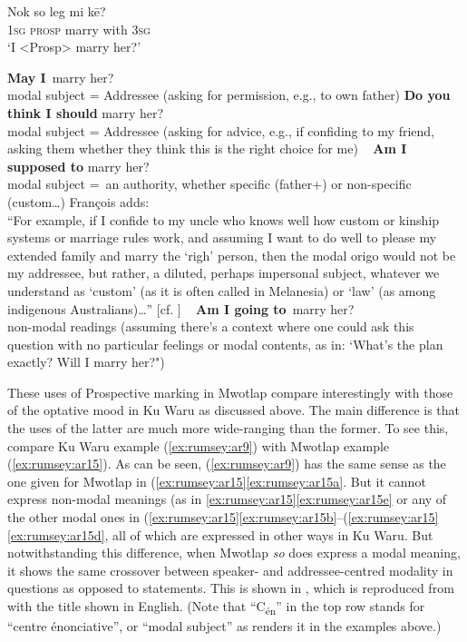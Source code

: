 \documentclass[output=paper]{langsci/langscibook}
\begin{document}
\begin{exe}
	\ex \label{ex:rumsey:ar16}
	\gll Nok so leg mi kē?\\
	1\textsc{sg} \textsc{prosp} marry with 3\textsc{sg}\\
	\trans ‘I <Prosp> marry her?’

\begin{xlist}
	\ex\label{ex:rumsey:ar16a} \textbf{May I} marry her? \\modal subject = Addressee (asking for permission, e.g., to own father)
	\ex\label{ex:rumsey:ar16b} \textbf{Do you think I should} marry her? \\modal subject = Addressee (asking for advice, e.g., if confiding to my friend, asking them whether they think this is the right choice for me)
  	\ex\label{ex:rumsey:ar16c} \textbf{Am I supposed to} marry her? \\modal subject = an authority, whether specific (father+) or non-specific (custom…) François adds:\\ “For example, if I confide to my uncle who knows well how custom or kinship systems or marriage rules work, and assuming I want to do well to please my extended family and marry the `righ' person, then the modal origo would not be my addressee, but rather, a diluted, perhaps impersonal subject, whatever we understand as `custom' (as it is often called in Melanesia) or `law' (as among indigenous Australians)…” [cf. \citealt[229]{Francois2003}]
  	\ex\label{ex:rumsey:ar16d} \textbf{Am I going to} marry her? \\ non-modal readings (assuming there's a context where one could ask this question with no particular feelings or modal contents, as in: `What's the plan exactly? Will I marry her?")
\end{xlist}
\end{exe}

These uses of Prospective marking in Mwotlap compare interestingly with those of the optative mood in Ku Waru as discussed above. The main difference is that the uses of the latter are much more wide-ranging than the former. To see this, compare Ku Waru example (\ref{ex:rumsey:ar9}) with Mwotlap example (\ref{ex:rumsey:ar15}). As can be seen, (\ref{ex:rumsey:ar9}) has the same sense as the one given for Mwotlap in (\ref{ex:rumsey:ar15}\ref{ex:rumsey:ar15a}.  But it cannot express non-modal meanings (as in \ref{ex:rumsey:ar15}\ref{ex:rumsey:ar15e} or any of the other modal ones in  (\ref{ex:rumsey:ar15}\ref{ex:rumsey:ar15b}--(\ref{ex:rumsey:ar15}\ref{ex:rumsey:ar15d}, all of which are expressed in other ways in Ku Waru. But notwithstanding this difference, when Mwotlap \textit{so} does express a modal meaning, it shows the same crossover between speaker- and addressee-centred modality in questions as opposed to statements. This is shown in , which is reproduced from \cite{Francois2003} with the title shown in English. (Note that “C\textsubscript{én}” in the top row stands for “centre énonciative”, or “modal subject” as \citeauthor{Francois2003} renders it in the examples above.)
\end{document}
